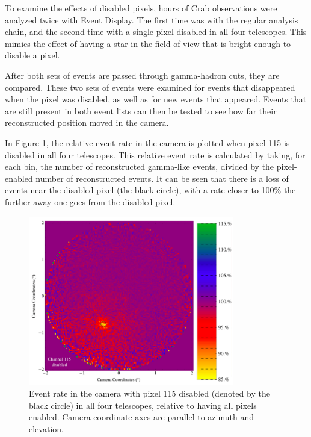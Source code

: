     To examine the effects of disabled pixels,  hours of Crab observations were analyzed twice with Event Display.
    The first time was with the regular analysis chain, and the second time with a single pixel disabled in all four telescopes.
    This mimics the effect of having a star in the field of view that is bright enough to disable a pixel.

    After both sets of events are passed through gamma-hadron cuts, they are compared.
    These two sets of events were examined for events that disappeared when the pixel was disabled, as well as for new events that appeared.
    Events that are still present in both event lists can then be tested to see how far their reconstructed position moved in the camera.

    In Figure \ref{fig:dpix_rel_camera}, the relative event rate in the camera is plotted when pixel 115 is disabled in all four telescopes.
    This relative event rate is calculated by taking, for each bin, the number of reconstructed gamma-like events, divided by the pixel-enabled number of reconstructed events.
    It can be seen that there is a loss of events near the disabled pixel (the black circle), with a rate closer to 100\% the further away one goes from the disabled pixel.

    \begin{figure}[ht]
      \centering
      \includegraphics[width=0.8\textwidth]{images/disabled_pixel/relativerate_camera}
      \caption[Relative Event Rate]{
        Event rate in the camera with pixel 115 disabled (denoted by the black circle) in all four telescopes, relative to having all pixels enabled.
        Camera coordinate axes are parallel to azimuth and elevation.
      }
      \label{fig:dpix_rel_camera}
    \end{figure}

